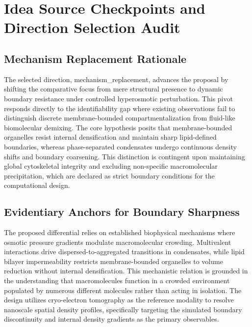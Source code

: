 \documentclass[conference]{IEEEtran}
\begin{document}
\appendices
\section{Idea Source Checkpoints and Direction Selection Audit}
\subsection{Mechanism Replacement Rationale}
The selected direction, mechanism\_replacement, advances the proposal by shifting the comparative focus from mere structural presence to dynamic boundary resistance under controlled hyperosmotic perturbation. This pivot responds directly to the identifiability gap where existing observations fail to distinguish discrete membrane-bounded compartmentalization from fluid-like biomolecular demixing. The core hypothesis posits that membrane-bounded organelles resist internal densification and maintain sharp lipid-defined boundaries, whereas phase-separated condensates undergo continuous density shifts and boundary coarsening. This distinction is contingent upon maintaining global cytoskeletal integrity and excluding non-specific macromolecular precipitation, which are declared as strict boundary conditions for the computational design.~\cite{cite_42ed299a53990c06}

\subsection{Evidentiary Anchors for Boundary Sharpness}
The proposed differential relies on established biophysical mechanisms where osmotic pressure gradients modulate macromolecular crowding. Multivalent interactions drive dispersed-to-aggregated transitions in condensates, while lipid bilayer impermeability restricts membrane-bounded organelles to volume reduction without internal densification. This mechanistic relation is grounded in the understanding that macromolecules function in a crowded environment populated by numerous different molecules rather than acting in isolation. The design utilizes cryo-electron tomography as the reference modality to resolve nanoscale spatial density profiles, specifically targeting the simulated boundary discontinuity and internal density gradients as the primary observables.~\cite{cite_42ed299a53990c06,cite_7161cfcb40366dd0}
\end{document}
